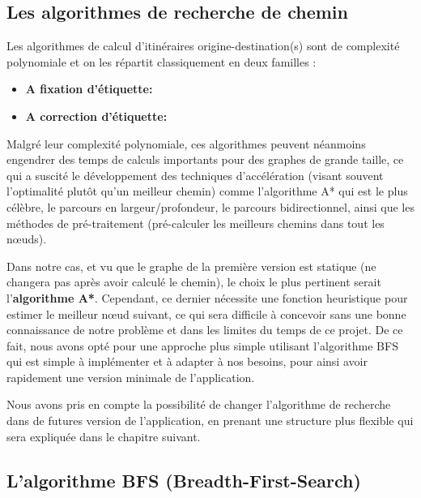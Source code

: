\subsection{Les algorithmes de recherche de chemin}
Les algorithmes de calcul d'itinéraires origine-destination(s) sont de complexité polynomiale et on les répartit classiquement en deux familles : 
\begin{itemize}
	\item \textbf{A fixation d'étiquette:} 
	\item \textbf{A correction d'étiquette:} 
\end{itemize}

Malgré leur complexité polynomiale, ces algorithmes peuvent néanmoins engendrer des temps de calculs importants pour des graphes de grande taille, ce qui a suscité le développement des techniques d'accélération (visant souvent l'optimalité plutôt qu'un meilleur chemin) comme l'algorithme A* qui est le plus célèbre, le parcours en largeur/profondeur, le parcours bidirectionnel, ainsi que les méthodes de pré-traitement (pré-calculer les meilleurs chemins dans tout les nœuds).
\newline

Dans notre cas, et vu que le graphe de la première version est statique (ne changera pas après avoir calculé le chemin), le choix le plus pertinent serait l'\textbf{algorithme A*}.
Cependant, ce dernier nécessite une fonction heuristique pour estimer le meilleur nœud suivant, ce qui sera difficile à concevoir sans une bonne connaissance de notre problème et dans les limites du temps de ce projet.
De ce fait, nous avons opté pour une approche plus simple utilisant l'algorithme BFS qui est simple à implémenter et à adapter à nos besoins, pour ainsi avoir rapidement une version minimale de l'application.

Nous avons pris en compte la possibilité de changer l'algorithme de recherche dans de futures version de l'application, en prenant une structure plus flexible qui sera expliquée dans le chapitre suivant.

\subsection{L'algorithme BFS (Breadth-First-Search)}

